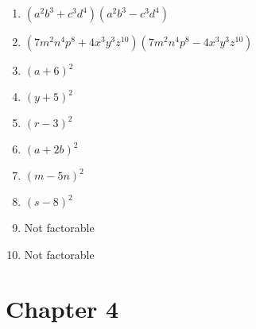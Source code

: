 \documentclass[a4paper]{JAC2003}
\begin{document}
\begin{enumerate}
\item $\left(a^{2} b^{3}+c^{3} d^{4}\right)\left(a^{2} b^{3}-c^{3}
d^{4}\right)$

\item $\left(7 m^{2} n^{4} p^{8}+4 x^{3} y^{3} z^{10}\right)\left(7 m^{2} n^{4} p^{8}-4 x^{3} y^{3} z^{10}\right)$

\item $(a+6)^{2}$

\item $(y+5)^{2}$

\item $(r-3)^{2}$

\item $(a+2 b)^{2}$

\item $(m-5 n)^{2}$

\item $(s-8)^{2}$

\item Not factorable

\item Not factorable
\end{enumerate}

\section{Chapter 4}
\end{document}
